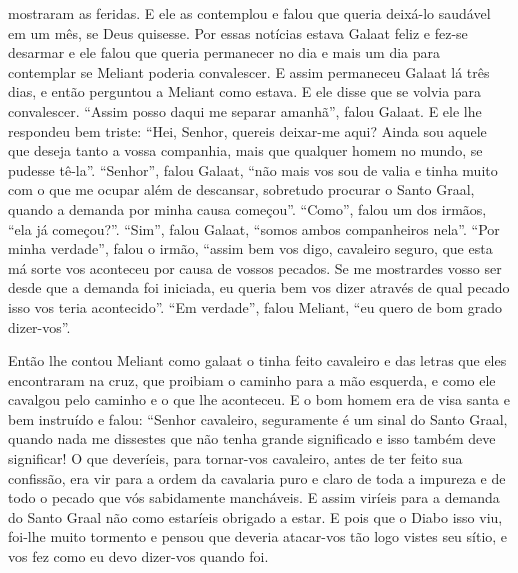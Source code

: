 mostraram as feridas. E ele as contemplou e falou que queria deixá-lo saudável
em um mês, se Deus quisesse. Por essas notícias estava Galaat feliz e fez-se
desarmar e ele falou que queria permanecer no dia e mais um dia para contemplar
se Meliant poderia convalescer. E assim permaneceu Galaat lá três dias, e então
perguntou a Meliant como estava. E ele disse que se volvia para convalescer.
“Assim posso daqui me separar amanhã”, falou Galaat. E ele lhe respondeu bem
triste: “Hei, Senhor, quereis deixar-me aqui? Ainda sou aquele que deseja tanto
a vossa companhia, mais que qualquer homem no mundo, se pudesse tê-la”.
“Senhor”, falou Galaat, “não mais vos sou de valia e tinha muito com o que me
ocupar além de descansar, sobretudo procurar o Santo Graal, quando a demanda
por minha causa começou”. “Como”, falou um dos irmãos, “ela já começou?”.
“Sim”, falou Galaat, “somos ambos companheiros nela”. “Por minha verdade”,
falou o irmão, “assim bem vos digo, cavaleiro seguro, que esta má sorte vos
aconteceu por causa de vossos pecados. Se me mostrardes vosso ser desde que a
demanda foi iniciada, eu queria bem vos dizer através de qual pecado isso vos
teria acontecido”. “Em verdade”, falou Meliant, “eu quero de bom grado
dizer-vos”. 

Então lhe contou Meliant como galaat o tinha feito cavaleiro e das letras que
eles encontraram na cruz, que proibiam o caminho para a mão esquerda, e como
ele cavalgou pelo caminho e o que lhe aconteceu. E o bom homem era de visa
santa e bem instruído e falou: “Senhor cavaleiro, seguramente é um sinal do
Santo Graal, quando nada me dissestes que não tenha grande significado e isso
também deve significar! O que deveríeis, para tornar-vos cavaleiro, antes de
ter feito sua confissão, era vir para a ordem da cavalaria puro e claro de toda
a impureza e de todo o pecado que vós sabidamente mancháveis. E assim viríeis
para a demanda do Santo Graal não como estaríeis obrigado a estar. E pois que o
Diabo isso viu, foi-lhe muito tormento e pensou que deveria atacar-vos tão logo
vistes seu sítio, e vos fez como eu devo dizer-vos quando foi.

